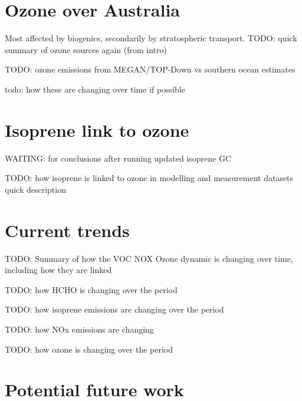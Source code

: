 \section{Ozone over Australia}
\label{Conclusions:ozone}
  
  Most affected by biogenics, secondarily by stratospheric transport.
 	TODO: quick summary of ozone sources again (from intro)
   
  TODO: ozone emissions from MEGAN/TOP-Down vs southern ocean estimates

  todo: how these are changing over time if possible

\section{Isoprene link to ozone}
\label{Conclusions:isoprene}
  
  WAITING: for conclusions after running updated isoprene GC
  
  TODO: how isoprene is linked to ozone in modelling and measurement datasets quick description
  
\section{Current trends}
\label{Conclusions:trends}

  TODO: Summary of how the VOC NOX Ozone dynamic is changing over time, including how they are linked
  
  TODO: how HCHO is changing over the period

  TODO: how isoprene emissions are changing over the period
  
  TODO: how NOx emissions are changing
  
  TODO: how ozone is changing over the period
  
\section{Potential future work}
\label{Conclusions:future}
  
